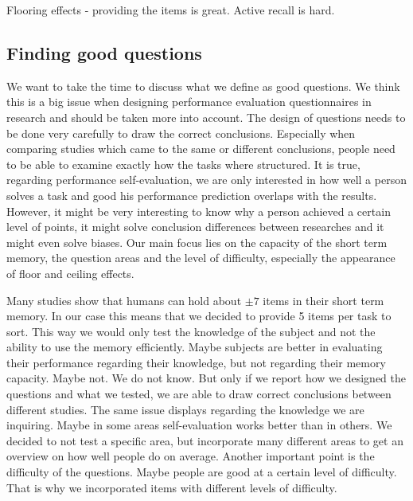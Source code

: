 \documentclass[../main/main.tex]{subfiles}
\begin{document}
	Flooring effects - providing the items is great. Active recall is hard.
	
	\subsection{Finding good questions}
	\label{sec:finding_questions}
	
	We want to take the time to discuss what we define as good questions. We think this is a big issue when designing performance evaluation questionnaires in research and should be taken more into account. The design of questions needs to be done very carefully to draw the correct conclusions. Especially when comparing studies which came to the same or different conclusions, people need to be able to examine exactly how the tasks where structured. It is true, regarding performance self-evaluation, we are only interested in how well a person solves a task and good his performance prediction overlaps with the results. However, it might be very interesting to know why a person achieved a certain level of points, it might solve conclusion differences between researches and it might even solve biases. Our main focus lies on the capacity of the short term memory, the question areas and the level of difficulty, especially the appearance of floor and ceiling effects.
	
	Many studies show that humans can hold about $\pm 7$ items in their short term memory. In our case this means that we decided to provide 5 items per task to sort. This way we would only test the knowledge of the subject and not the ability to use the memory efficiently. Maybe subjects are better in evaluating their performance regarding their knowledge, but not regarding their memory capacity. Maybe not. We do not know. But only if we report how we designed the questions and what we tested, we are able to draw correct conclusions between different studies. The same issue displays regarding the knowledge we are inquiring. Maybe in some areas self-evaluation works better than in others. We decided to not test a specific area, but incorporate many different areas to get an overview on how well people do on average. Another important point is the difficulty of the questions. Maybe people are good at a certain level of difficulty. That is why we incorporated items with different levels of difficulty.
	
\end{document}
